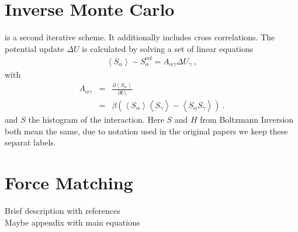 \section{Inverse Monte Carlo}
\imc is a second iterative scheme. It additionally includes cross correlations. The potential update $\Delta U$ is calculated by solving a set of linear equations
\begin{align}
    \left<S_{\alpha}\right> - S_{\alpha}^{\text{ref}}= A_{\alpha \gamma} \Delta U_{\gamma}~,
  \label{eq:imc}
\end{align}
%
with
\begin{eqnarray}
  \label{eq:covariance}
  A_{\alpha \gamma} &=& \frac{\partial \left< S_{\alpha} \right> }{\partial U_{\gamma}}  \\
  \nonumber
  &=&
  \beta \left( \left<S_{\alpha} \right>\left<S_{\gamma} \right> - \left<S_{\alpha} S_{\gamma} \right>  \right)~.
  \nonumber
\end{eqnarray}
and $S$ the histogram of the interaction. Here $S$ and $H$ from Boltzmann Inversion both mean the same, due to notation used in the original papers we keep these separat labels.

\section{Force Matching}
\sasha

Brief description with references \\
Maybe appendix with main equations \\

